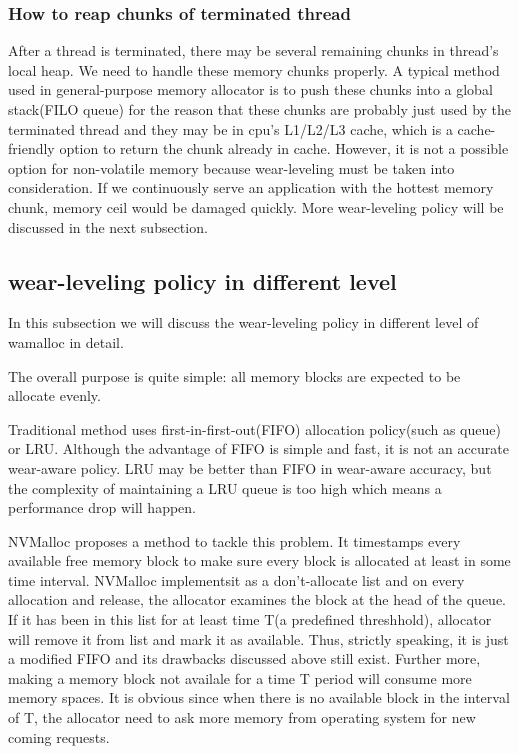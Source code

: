 \documentclass{vldb}
\begin{document}
\subsubsection{How to reap chunks of terminated thread}
After a thread is terminated, there may be several remaining chunks in thread's local heap. 
We need to handle these memory chunks properly.
A typical method used in general-purpose memory allocator is to push these chunks into a global stack(FILO queue)
for the reason that these chunks are probably just used by the terminated thread and they may be in cpu's L1/L2/L3 cache, which is a cache-friendly option to return the chunk already in cache.
However, it is not a possible option for non-volatile memory because wear-leveling must be taken into consideration.
If we continuously serve an application with the hottest memory chunk, memory ceil would be damaged quickly.
More wear-leveling policy will be discussed in the next subsection.

\subsection{wear-leveling policy in different level}

In this subsection we will discuss the wear-leveling policy in different level of wamalloc in detail.

The overall purpose is quite simple: all memory blocks are expected to be allocate evenly.

Traditional method uses first-in-first-out(FIFO) allocation policy(such as queue) or LRU\cite{zhou2009durable}\cite{rodriguez2015write}.
Although the advantage of FIFO is simple and fast, it is not an accurate wear-aware policy.
LRU may be better than FIFO in wear-aware accuracy, but the complexity of maintaining a LRU queue is too high which means a performance drop will happen.

NVMalloc\cite{moraru2013consistent} proposes a method to tackle this problem.
It timestamps every available free memory block to make sure every block is allocated at least in some time interval. NVMalloc implementsit as a don't-allocate list and on every allocation and release, the allocator examines the block at the head of the queue.
If it has been in this list for at least time T(a predefined threshhold), allocator will remove it from list and mark it as available.
Thus, strictly speaking, it is just a modified FIFO and its drawbacks discussed above still exist.
Further more, making a memory block not availale for a time T period will consume more memory spaces. It is obvious since when there is no available block in the interval of T, the allocator need to ask more memory from operating system for new coming requests.
\end{document}
